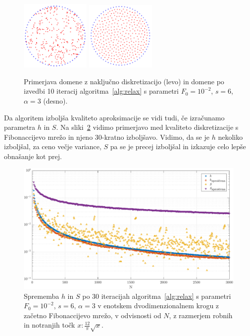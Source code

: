 \documentclass[12pt,a4paper,twoside]{article}
\theoremstyle{definition} %
\theoremstyle{plain} %
\numberwithin{equation}{section}
\newlength{\iw}
\begin{document}
\begin{figure}[!ht]
  \centering
  \includegraphics[width=0.3\textwidth]{images/domain_circle.png}
  \hspace{1em}
  \includegraphics[width=0.3\textwidth]{images/domain_circle_relaxed.png}
  \caption[Primerjava naključno diskretizirane in izboljšane domene.]{Primerjava domene z naključno
  diskretizacijo (levo) in domene po izvedbi 10 iteracij algoritma~\ref{alg:relax} s parametri $F_0
  = 10^{-2}$, $s = 6$, $\alpha = 3$ (desno).}
  \label{fig:relax-circle}
\end{figure}

Da algoritem izboljša kvaliteto aproksimacije se vidi tudi, če izračunamo
parametra $h$ in $S$. Na sliki~\ref{fig:relax-hs} vidimo primerjavo med
kvaliteto diskretizacije s Fibonaccijevo mrežo in njeno 30-kratno izboljšavo.
Vidimo, da se je $h$ nekoliko izboljšal, za ceno večje variance,
$S$ pa se je precej izboljšal in izkazuje celo lepše obnašanje kot prej.

\begin{figure}[ht]
  \centering
  \includegraphics[width=\iw]{images/relax_improvement.pdf}
  \caption[Sprememba kvalitete diskretizacije po izboljšavi.]{Sprememba $h$ in
    $S$ po 30 iteracijah algoritma~\ref{alg:relax} s parametri $F_0 = 10^{-2}$,
    $s = 6$, $\alpha = 3$ v enotskem dvodimenzionalnem krogu z začetno
    Fibonaccijevo mrežo, v odvisnosti od $N$, z razmerjem robnih in notranjih
  točk $x : \frac{12}{\pi} \sqrt{x}$.}
  \label{fig:relax-hs}
\end{figure}
\end{document}
